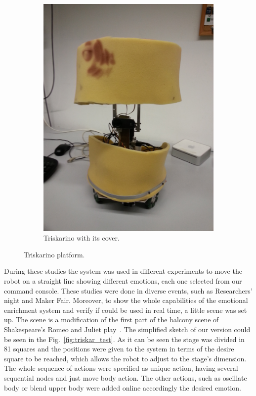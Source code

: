 \begin{figure}
\begin{subfigure}[c]{0.2\textwidth}
	\includegraphics[width=\textwidth]{./Images/platform_fome.jpg}
	\caption{Triskarino with its cover.}
	\label{fig:triskar}
	\end{subfigure}
	\caption{Triskarino platform.}
	\label{fig:robot}
\end{figure}  
 During these studies the system was used in different experiments to move the robot on a straight line showing different emotions, each one selected from our command console. These studies were done in diverse events, such as Researchers' night and Maker Fair. Moreover, to show the whole capabilities of the emotional enrichment system and verify if could be used in real time, a little scene was set up. The scene is a modification of the first part of the balcony scene of Shakespeare's Romeo and Juliet play~\cite{RAndJ}.  The simplified sketch of our version could be seen in the Fig.~\ref{fig:triskar_test}. As it can be seen the stage was divided in 81 squares and the positions were given to the system in terms of the desire square to be reached, which allows the robot to adjust to the stage's dimension.
The whole sequence of actions were specified as unique action, having several sequential nodes and just move body action. The other actions, such as oscillate body or blend upper body were added online accordingly the desired emotion. 
